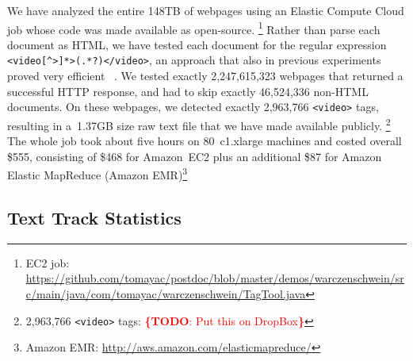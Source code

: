 \documentclass{sig-alternate}
\newcommand{\inlinelistingsize}{\fontsize{8pt}{11pt}}
\let\oldurl\url
\renewcommand{\url}[1]{\inlinelistingsize\oldurl{#1}}
\newcommand{\todo}[1]{\noindent\textcolor{red}{{\bf \{TODO}: #1{\bf \}}}}
\begin{document}
We have analyzed the entire 148TB of webpages
using an Elastic Compute Cloud job
whose code was made available as open-source.%
\footnote{EC2 job:
\url{https://github.com/tomayac/postdoc/blob/master/demos/warczenschwein/src/main/java/com/tomayac/warczenschwein/TagTool.java}}
Rather than parse each document as HTML,
we have tested each document for the regular expression
\texttt{<video[\^{}>]*>(.*?)</video>},
an approach that also in previous experiments
proved very efficient%
~\cite{bizer2013deployment,muhleisen2012web}.
We tested exactly 2,247,615,323 webpages
that returned a successful HTTP response,
and had to skip exactly 46,524,336  non-HTML documents.
On these webpages, we detected exactly
2,963,766 \texttt{<video>} tags,
resulting in a~1.37GB size raw text file
that we have made available publicly.%
\footnote{2,963,766 \texttt{<video>} tags: \todo{Put this on DropBox}}
The whole job took about five hours on
80~c1.xlarge machines and costed overall \$555,
consisting of \$468 for Amazon~EC2
plus an additional \$87 for Amazon Elastic MapReduce
 (Amazon EMR)\footnote{Amazon EMR:
\url{http://aws.amazon.com/elasticmapreduce/}}

\subsection{Text Track Statistics}
\end{document}
